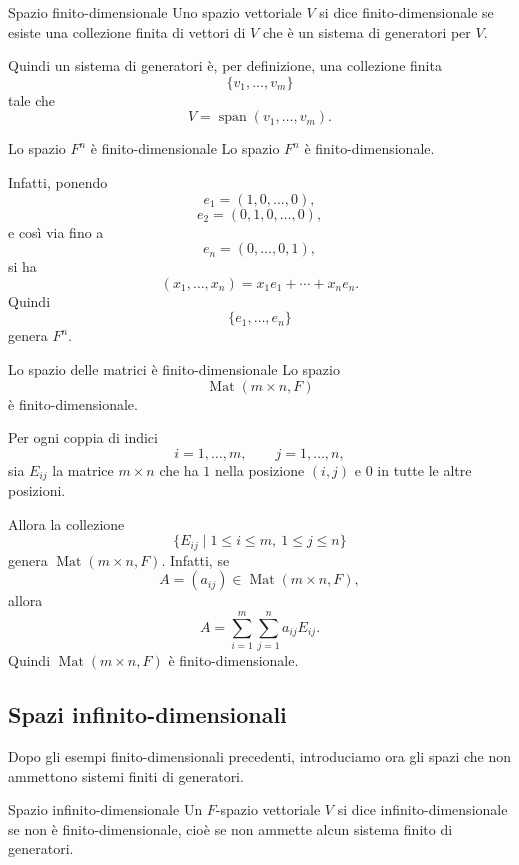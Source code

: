 \documentclass[a4paper]{article}
\begin{document}
\begin{snippetdefinition}{Spazio finito-dimensionale}
    Uno spazio vettoriale \(V\) si dice finito-dimensionale se esiste una collezione finita di vettori di \(V\) che è un sistema di generatori per \(V\).
\end{snippetdefinition}

Quindi un sistema di generatori è, per definizione, una collezione finita
\[
    \{v_1,\ldots,v_m\}
\]
tale che
\[
    V=\operatorname{span}(v_1,\ldots,v_m).
\]

\begin{snippetexample}{Lo spazio \(F^n\) è finito-dimensionale}
    Lo spazio \(F^n\) è finito-dimensionale.

    Infatti, ponendo
    \[
        e_1=(1,0,\ldots,0),
    \]
    \[
        e_2=(0,1,0,\ldots,0),
    \]
    e così via fino a
    \[
        e_n=(0,\ldots,0,1),
    \]
    si ha
    \[
        (x_1,\ldots,x_n)
        =
        x_1e_1+\cdots+x_ne_n.
    \]
    Quindi
    \[
        \{e_1,\ldots,e_n\}
    \]
    genera \(F^n\).
\end{snippetexample}

\begin{snippetexample}{Lo spazio delle matrici è finito-dimensionale}
    Lo spazio
    \[
        \operatorname{Mat}(m\times n,F)
    \]
    è finito-dimensionale.

    Per ogni coppia di indici
    \[
        i=1,\ldots,m,
        \qquad
        j=1,\ldots,n,
    \]
    sia \(E_{ij}\) la matrice \(m\times n\) che ha \(1\) nella posizione \((i,j)\) e \(0\) in tutte le altre posizioni.

    Allora la collezione
    \[
        \{E_{ij}\mid 1\leq i\leq m,\ 1\leq j\leq n\}
    \]
    genera \(\operatorname{Mat}(m\times n,F)\). Infatti, se
    \[
        A=(a_{ij})\in \operatorname{Mat}(m\times n,F),
    \]
    allora
    \[
        A
        =
        \sum_{i=1}^{m}\sum_{j=1}^{n} a_{ij}E_{ij}.
    \]
    Quindi \(\operatorname{Mat}(m\times n,F)\) è finito-dimensionale.
\end{snippetexample}

\subsection{Spazi infinito-dimensionali}

Dopo gli esempi finito-dimensionali precedenti, introduciamo ora gli spazi che non ammettono sistemi finiti di generatori.

\begin{snippetdefinition}{Spazio infinito-dimensionale}
    Un \(F\)-spazio vettoriale \(V\) si dice infinito-dimensionale se non è finito-dimensionale, cioè se non ammette alcun sistema finito di generatori.
\end{snippetdefinition}
\end{document}
